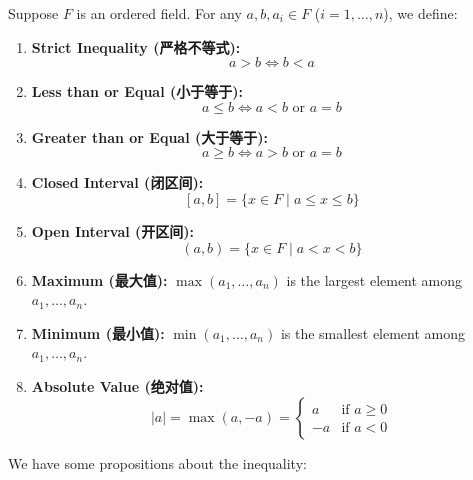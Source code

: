 \documentclass[
	UTF-8,
	11pt, %
	a4paper, %
]{LegrandOrangeBook}
\begin{document}
    \begin{definition}
    Suppose $F$ is an ordered field. For any $a, b, a_i \in F$ ($i=1, \dots, n$), we define:

    \begin{enumerate}
        \item \textbf{Strict Inequality (严格不等式):} \\
        $$a > b \iff b < a$$
        
        \item \textbf{Less than or Equal (小于等于):} \\
        $$a \le b \iff a < b \text{ or } a = b$$
        
        \item \textbf{Greater than or Equal (大于等于):} \\
        $$a \ge b \iff a > b \text{ or } a = b$$
        
        \item \textbf{Closed Interval (闭区间):} \\
        $$[a, b] = \{ x \in F \mid a \le x \le b \}$$
        
        \item \textbf{Open Interval (开区间):} \\
        $$(a, b) = \{ x \in F \mid a < x < b \}$$
        
        \item \textbf{Maximum (最大值):} 
        $\max(a_1, \dots, a_n)$ is the largest element among $a_1, \dots, a_n$.
        
        \item \textbf{Minimum (最小值):} 
        $\min(a_1, \dots, a_n)$ is the smallest element among $a_1, \dots, a_n$.
        
        \item \textbf{Absolute Value (绝对值):} \\
        $$|a| = \max(a, -a) = \begin{cases} a & \text{if } a \ge 0 \\ -a & \text{if } a < 0 \end{cases}$$
    \end{enumerate}
    \end{definition}

    \newpage

    We have some propositions about the inequality:
\end{document}
